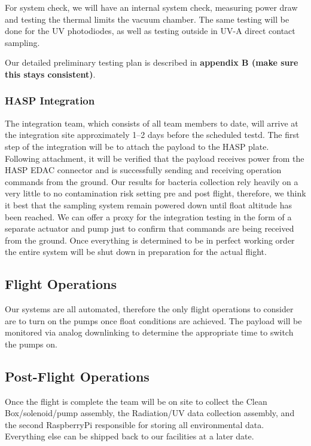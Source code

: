 For system check, we will have an internal system check, measuring power draw and testing the thermal limits the vacuum chamber. The same testing will be done for the UV photodiodes, as well as testing outside in UV-A direct contact sampling. 
    
Our detailed preliminary testing plan is described in \textbf{appendix B (make sure this stays consistent)}.  

\subsubsection{HASP Integration}
The integration team, which consists of all team members to date, will arrive at the integration site approximately \numrange{1}{2} days before the scheduled testd. The first step of the integration will be to attach the payload to the HASP plate. Following attachment, it will be verified that the payload receives power from the HASP EDAC connector and is successfully sending and receiving operation commands from the ground. Our results for bacteria collection rely heavily on a very little to no contamination risk setting pre and post flight, therefore, we think it best that the sampling system remain powered down until float altitude has been reached. We can offer a proxy for the integration testing in the form of a separate actuator and pump just to confirm that commands are being received from the ground. Once everything is determined to be in perfect working order the entire system will be shut down in preparation for the actual flight.

\subsection{Flight Operations}
Our systems are all automated, therefore the only flight operations to consider are to turn on the pumps once float conditions are achieved. The payload will be monitored via analog downlinking to determine the appropriate time to switch the pumps on. 

\subsection{Post-Flight Operations}
Once the flight is complete the team will be on site to collect the Clean Box/solenoid/pump assembly, the Radiation/UV data collection assembly, and the second RaspberryPi responsible for storing all environmental data. Everything else can be shipped back to our facilities at a later date.  



